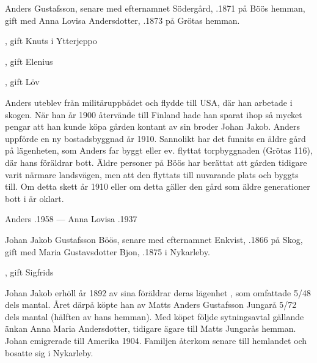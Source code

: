 Anders Gustafsson, senare med efternamnet Södergård, .1871 på Böös hemman, gift med Anna Lovisa Andersdotter, .1873 på Grötas hemman.
\begin{jhchildren}
  \item {}, gift Knuts i Ytterjeppo
  \item {}
  \item {}
  \item {}, gift Elenius
  \item {}, gift Löv
  \item {}
\end{jhchildren}
Anders uteblev från militäruppbådet och flydde till USA, där han arbetade i skogen. När han år 1900 återvände till Finland hade han sparat ihop så mycket pengar att han kunde köpa gården kontant av sin broder Johan Jakob. Anders uppförde en ny bostadsbyggnad år 1910. Sannolikt har det funnits en äldre gård på lägenheten, som Anders far byggt eller ev. flyttat torpbyggnaden (Grötas 116), där hans föräldrar bott. Äldre personer på Böös har berättat att gården tidigare varit närmare landsvägen, men att den flyttats till nuvarande plats och byggts till. Om detta skett år 1910 eller om detta gäller den gård som äldre generationer bott i är oklart.

Anders .1958  ---  Anna Lovisa .1937


Johan Jakob Gustafsson Böös, senare med efternamnet Enkvist, .1866 på Skog, gift med Maria Gustavsdotter Bjon, .1875 i Nykarleby.
\begin{jhchildren}
  \item {}
  \item {}, gift Sigfrids
\end{jhchildren}
Johan Jakob erhöll år 1892 av sina föräldrar deras lägenhet , som omfattade 5/48 dels mantal. Året därpå köpte han av Matts Anders Gustafsson Jungarå 5/72 dels mantal (hälften av hans hemman). Med köpet följde sytningsavtal gällande änkan Anna Maria Andersdotter, tidigare ägare till Matts Jungarås hemman. Johan emigrerade till Amerika 1904. Familjen återkom senare till hemlandet och bosatte sig i Nykarleby.


